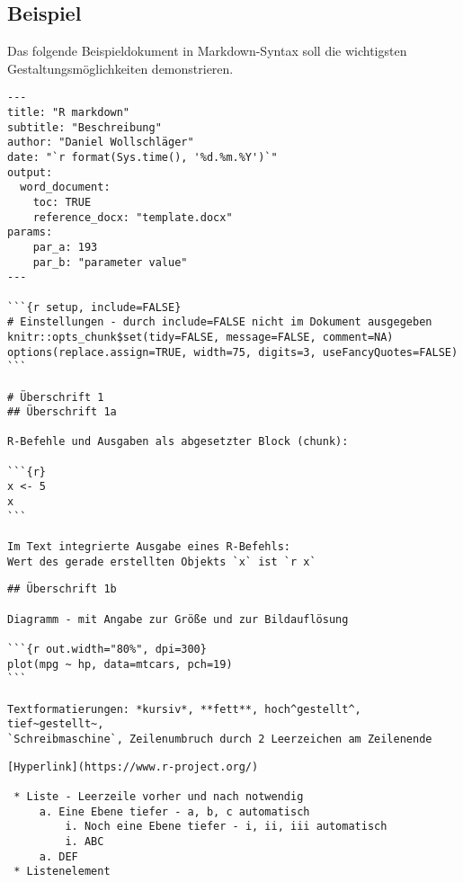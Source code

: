 \subsection{Beispiel}

Das folgende Beispieldokument in Markdown-Syntax soll die wichtigsten Gestaltungsmöglichkeiten demonstrieren.
\begin{lstlisting}
---
title: "R markdown"
subtitle: "Beschreibung"
author: "Daniel Wollschläger"
date: "`r format(Sys.time(), '%d.%m.%Y')`"
output:
  word_document:
    toc: TRUE
    reference_docx: "template.docx"
params:
    par_a: 193
    par_b: "parameter value"
---

```{r setup, include=FALSE}
# Einstellungen - durch include=FALSE nicht im Dokument ausgegeben
knitr::opts_chunk$set(tidy=FALSE, message=FALSE, comment=NA)
options(replace.assign=TRUE, width=75, digits=3, useFancyQuotes=FALSE)
```

# Überschrift 1
## Überschrift 1a

R-Befehle und Ausgaben als abgesetzter Block (chunk):

```{r}
x <- 5
x
```

Im Text integrierte Ausgabe eines R-Befehls:
Wert des gerade erstellten Objekts `x` ist `r x`
\end{lstlisting}

\begin{lstlisting}
## Überschrift 1b

Diagramm - mit Angabe zur Größe und zur Bildauflösung

```{r out.width="80%", dpi=300}
plot(mpg ~ hp, data=mtcars, pch=19)
```

Textformatierungen: *kursiv*, **fett**, hoch^gestellt^, tief~gestellt~,  
`Schreibmaschine`, Zeilenumbruch durch 2 Leerzeichen am Zeilenende
\end{lstlisting}

\begin{lstlisting}
[Hyperlink](https://www.r-project.org/)

 * Liste - Leerzeile vorher und nach notwendig
     a. Eine Ebene tiefer - a, b, c automatisch
         i. Noch eine Ebene tiefer - i, ii, iii automatisch
         i. ABC
     a. DEF
 * Listenelement
\end{lstlisting}

